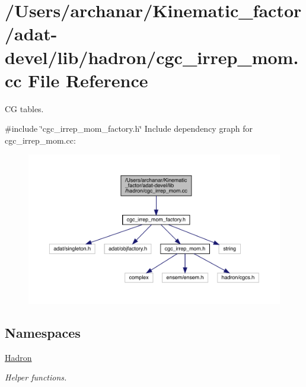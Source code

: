 \hypertarget{adat-devel_2lib_2hadron_2cgc__irrep__mom_8cc}{}\section{/\+Users/archanar/\+Kinematic\+\_\+factor/adat-\/devel/lib/hadron/cgc\+\_\+irrep\+\_\+mom.cc File Reference}
\label{adat-devel_2lib_2hadron_2cgc__irrep__mom_8cc}


CG tables.  


{\ttfamily \#include \char`\"{}cgc\+\_\+irrep\+\_\+mom\+\_\+factory.\+h\char`\"{}}\newline
Include dependency graph for cgc\+\_\+irrep\+\_\+mom.\+cc\+:
\nopagebreak
\begin{figure}[H]
\begin{center}
\leavevmode
\includegraphics[width=350pt]{d5/dca/adat-devel_2lib_2hadron_2cgc__irrep__mom_8cc__incl}
\end{center}
\end{figure}
\subsection*{Namespaces}
\begin{DoxyCompactItemize}
\item 
 \mbox{\hyperlink{namespaceHadron}{Hadron}}
\begin{DoxyCompactList}\small\item\em Helper functions. \end{DoxyCompactList}\end{DoxyCompactItemize}
